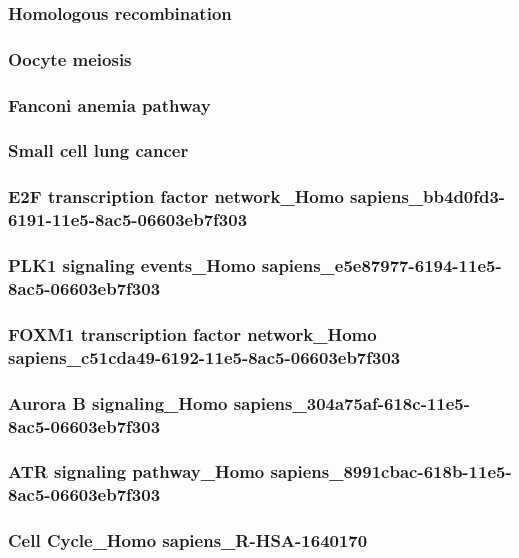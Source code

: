 \documentclass[3p,authoryear,preprint,12pt]{elsarticle}
\begin{document}
\subsubsection{Homologous recombination}

\subsubsection{Oocyte meiosis}

\subsubsection{Fanconi anemia pathway}

\subsubsection{Small cell lung cancer}

\subsubsection{E2F transcription factor network\_Homo sapiens\_bb4d0fd3-6191-11e5-8ac5-06603eb7f303}

\subsubsection{PLK1 signaling events\_Homo sapiens\_e5e87977-6194-11e5-8ac5-06603eb7f303}

\subsubsection{FOXM1 transcription factor network\_Homo sapiens\_c51cda49-6192-11e5-8ac5-06603eb7f303}

\subsubsection{Aurora B signaling\_Homo sapiens\_304a75af-618c-11e5-8ac5-06603eb7f303}

\subsubsection{ATR signaling pathway\_Homo sapiens\_8991cbac-618b-11e5-8ac5-06603eb7f303}

\subsubsection{Cell Cycle\_Homo sapiens\_R-HSA-1640170}
\end{document}
